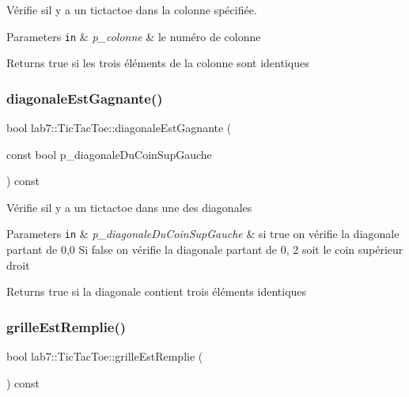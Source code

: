 Vérifie s\textquotesingle{}il y a un tictactoe dans la colonne spécifiée. 
\begin{DoxyParams}[1]{Parameters}
\mbox{\tt in}  & {\em p\+\_\+colonne} & le numéro de colonne \\
\hline
\end{DoxyParams}
\begin{DoxyReturn}{Returns}
true si les trois éléments de la colonne sont identiques 
\end{DoxyReturn}
\mbox{\label{classlab7_1_1TicTacToe_a422b5f693cf88fb002eb3f87187999a4}} 
\subsubsection{\texorpdfstring{diagonale\+Est\+Gagnante()}{diagonaleEstGagnante()}}
{\footnotesize\ttfamily bool lab7\+::\+Tic\+Tac\+Toe\+::diagonale\+Est\+Gagnante (\begin{DoxyParamCaption}\item[{const bool}]{p\+\_\+diagonale\+Du\+Coin\+Sup\+Gauche }\end{DoxyParamCaption}) const}

Vérifie s\textquotesingle{}il y a un tictactoe dans une des diagonales 
\begin{DoxyParams}[1]{Parameters}
\mbox{\tt in}  & {\em p\+\_\+diagonale\+Du\+Coin\+Sup\+Gauche} & si true on vérifie la diagonale partant de 0,0 Si false on vérifie la diagonale partant de 0, 2 soit le coin supérieur droit \\
\hline
\end{DoxyParams}
\begin{DoxyReturn}{Returns}
true si la diagonale contient trois éléments identiques 
\end{DoxyReturn}
\mbox{\label{classlab7_1_1TicTacToe_a8e72e4ebd69642f050c74f2c41adf734}} 
\subsubsection{\texorpdfstring{grille\+Est\+Remplie()}{grilleEstRemplie()}}
{\footnotesize\ttfamily bool lab7\+::\+Tic\+Tac\+Toe\+::grille\+Est\+Remplie (\begin{DoxyParamCaption}{ }\end{DoxyParamCaption}) const}


